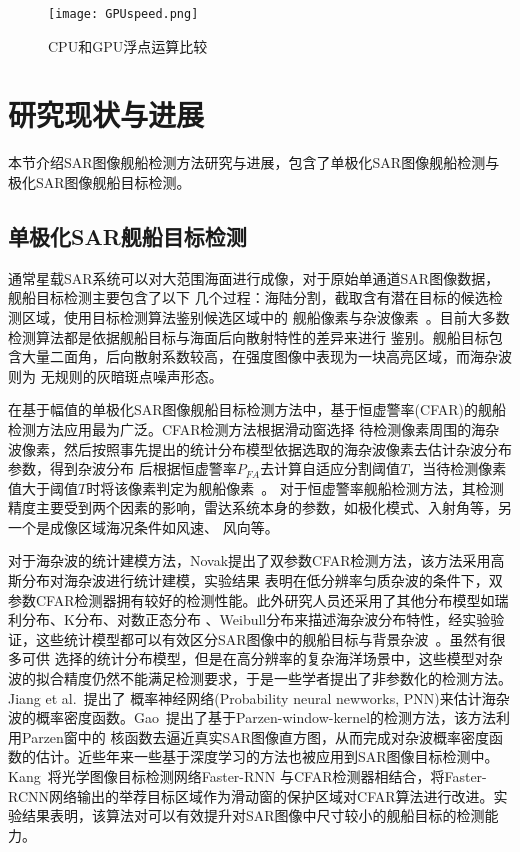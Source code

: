   \begin{figure}[H] %
    \centering
    \texttt{[image: GPUspeed.png]}
    \caption{CPU和GPU浮点运算比较}
    \label{fig:chap1:GPUspeed}
  \end{figure}

\section{研究现状与进展}
  本节介绍SAR图像舰船检测方法研究与进展，包含了单极化SAR图像舰船检测与极化SAR图像舰船目标检测。
\subsection{单极化SAR舰船目标检测}
    通常星载SAR系统可以对大范围海面进行成像，对于原始单通道SAR图像数据，舰船目标检测主要包含了以下
    几个过程：海陆分割，截取含有潜在目标的候选检测区域，使用目标检测算法鉴别候选区域中的
    舰船像素与杂波像素~\cite{article}。目前大多数检测算法都是依据舰船目标与海面后向散射特性的差异来进行
    鉴别。舰船目标包含大量二面角，后向散射系数较高，在强度图像中表现为一块高亮区域，而海杂波则为
    无规则的灰暗斑点噪声形态。

    在基于幅值的单极化SAR图像舰船目标检测方法中，基于恒虚警率(CFAR)的舰船检测方法应用最为广泛。CFAR检测方法根据滑动窗选择
    待检测像素周围的海杂波像素，然后按照事先提出的统计分布模型依据选取的海杂波像素去估计杂波分布参数，得到杂波分布
    后根据恒虚警率$P_{FA}$去计算自适应分割阈值$T$，当待检测像素值大于阈值$T$时将该像素判定为舰船像素~\cite{王兆成2017基于单极化}。
    对于恒虚警率舰船检测方法，其检测精度主要受到两个因素的影响，雷达系统本身的参数，如极化模式、入射角等，另一个是成像区域海况条件如风速、
    风向等。

    对于海杂波的统计建模方法，Novak\cite{Novak}提出了双参数CFAR检测方法，该方法采用高斯分布对海杂波进行统计建模，实验结果
    表明在低分辨率匀质杂波的条件下，双参数CFAR检测器拥有较好的检测性能。此外研究人员还采用了其他分布模型如瑞利分布、K分布、对数正态分布
    、Weibull分布来描述海杂波分布特性，经实验验证，这些统计模型都可以有效区分SAR图像中的舰船目标与背景杂波~\cite{Carretero2010Statistical}。虽然有很多可供
    选择的统计分布模型，但是在高分辨率的复杂海洋场景中，这些模型对杂波的拟合精度仍然不能满足检测要求，于是一些学者提出了非参数化的检测方法。Jiang et al.~\cite{Q2000Automatic}提出了
    概率神经网络(Probability neural newworks, PNN)来估计海杂波的概率密度函数。Gao~\cite{Gao2011A}提出了基于Parzen-window-kernel的检测方法，该方法利用Parzen窗中的
    核函数去逼近真实SAR图像直方图，从而完成对杂波概率密度函数的估计。近些年来一些基于深度学习的方法也被应用到SAR图像目标检测中。Kang~\cite{Miao2017A}将光学图像目标检测网络Faster-RNN
    与CFAR检测器相结合，将Faster-RCNN网络输出的举荐目标区域作为滑动窗的保护区域对CFAR算法进行改进。实验结果表明，该算法对可以有效提升对SAR图像中尺寸较小的舰船目标的检测能力。

